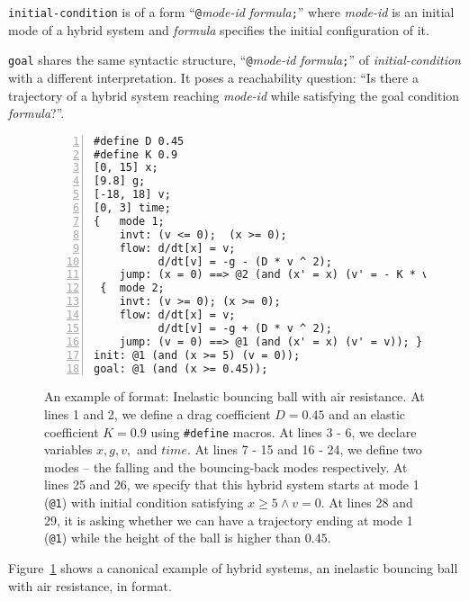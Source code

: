 \texttt{initial-condition} is of a form
``\texttt{@}\textit{mode-id} \textit{formula}\texttt{;}''
where \textit{mode-id} is an initial mode of a hybrid system and
\textit{formula} specifies the initial configuration of it.

\texttt{goal} shares the same syntactic structure,
``\texttt{@}\textit{mode-id} \textit{formula}\texttt{;}'' of
\textit{initial-condition} with a different interpretation. It poses a
reachability question: ``Is there a trajectory of a hybrid system
reaching \textit{mode-id} while satisfying the goal condition \textit{formula}?''.

\begin{figure}
  \centering
  \begin{Verbatim}[fontfamily=courier, frame=single, framesep=1mm,
  numbers=left, fontsize=\scriptsize]
#define D 0.45
#define K 0.9
[0, 15] x;
[9.8] g;
[-18, 18] v;
[0, 3] time;
{   mode 1;
    invt: (v <= 0);  (x >= 0);
    flow: d/dt[x] = v;
          d/dt[v] = -g - (D * v ^ 2);
    jump: (x = 0) ==> @2 (and (x' = x) (v' = - K * v)); }
 {  mode 2;
    invt: (v >= 0); (x >= 0);
    flow: d/dt[x] = v;
          d/dt[v] = -g + (D * v ^ 2);
    jump: (v = 0) ==> @1 (and (x' = x) (v' = v)); }
init: @1 (and (x >= 5) (v = 0));
goal: @1 (and (x >= 0.45));
\end{Verbatim}
\caption{An example of \drh{} format: Inelastic bouncing ball with air
  resistance. At lines 1 and 2, we define a drag coefficient $D = 0.45$
  and an elastic coefficient $K = 0.9$ using \texttt{\#define} macros.
  At lines 3 - 6, we declare variables $x, g, v,$ and $time$. At lines
  7 - 15 and 16 - 24, we define two modes -- the falling and the
  bouncing-back modes respectively. At lines 25 and 26, we specify
  that this hybrid system starts at mode 1 (\texttt{@1}) with initial
  condition satisfying $x \ge 5 \land v = 0$. At lines 28 and 29, it
  is asking whether we can have a trajectory ending at mode 1
  (\texttt{@1}) while the height of the ball is higher than $0.45$.}
\label{fig:bouncing-ball-drh}
\end{figure}

Figure~\ref{fig:bouncing-ball-drh} shows a canonical example of hybrid
systems, an inelastic bouncing ball with air resistance, in \drh{}
format.

